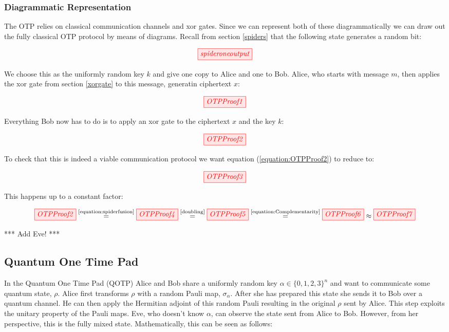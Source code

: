 \documentclass[]{article}
\newcommand{\equaltext}[1]{\ensuremath{\stackrel{\text{#1}}{=}}}
\begin{document}
\subsubsection{Diagrammatic Representation}

The OTP relies on classical communication channels and xor gates. Since we can represent both of these diagrammatically we can draw out the fully classical OTP protocol by means of diagrams. Recall from section \ref{spiders} that the following state generates a random bit:

\begin{equation}
	\tikzfig{spideroneoutput}
\end{equation}

We choose this as the uniformly random key $k$ and give one copy to Alice and one to Bob. Alice, who starts with message $m$, then applies the xor gate from section \ref{xorgate} to this message, generatin ciphertext $x$:

\begin{equation}
	\tikzfig{OTPProof1}
\end{equation}

Everything Bob now has to do is to apply an xor gate to the ciphertext $x$ and the key $k$:

\begin{equation}
\label{equation:OTPProof2}
\tikzfig{OTPProof2}
\end{equation}

To check that this is indeed a viable communication protocol we want equation (\ref{equation:OTPProof2}) to reduce to:

\begin{equation}
\label{equation:OTPProof3}
\tikzfig{OTPProof3}
\end{equation}

This happens up to a constant factor:

\begin{equation}
\label{equation:OTPProoflong}
\tikzfig{OTPProof2}\equaltext{\ref{equation:spiderfusion}} \tikzfig{OTPProof4} \equaltext{\ref{doubling}} \tikzfig{OTPProof5} \equaltext{\ref{equation:Complementarity}} \tikzfig{OTPProof6} \approx \tikzfig{OTPProof7}
\end{equation}

*** Add Eve! ***

\subsection{Quantum One Time Pad}
\label{QOTP}
In the Quantum One Time Pad (QOTP) Alice and Bob share a uniformly random key $ \alpha \in \{0,1,2,3\}^n$ and want to communicate some quantum state, $\rho$. Alice first transforms $\rho$ with a random Pauli map, $\sigma_\alpha$. After she has prepared this state she sends it to Bob over a quantum channel. He can then apply the Hermitian adjoint of this random Pauli resulting in the original $\rho$ sent by Alice. This step exploits the unitary property of the Pauli maps. Eve, who doesn't know $\alpha$, can observe the state sent from Alice to Bob. However, from her perspective, this is the fully mixed state. Mathematically, this can be seen as follows:
\end{document}

